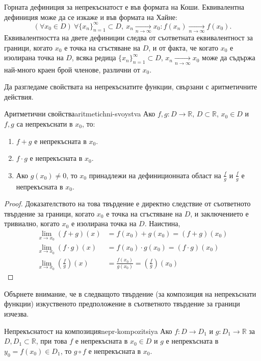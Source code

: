 Горната дефиниция за непрекъснатост е във формата на Коши. Еквивалентна дефиниция може да се изкаже и във формата на Хайне:
\[
(\forall x_0 \in D)\ \forall \{x_n\}_{n=1}^\infty \subset D,\ x_n \xrightarrow[n \to \infty]{} x_0 : f(x_n) \xrightarrow[n \to \infty]{} f(x_0).
\]
Еквивалентността на двете дефиниции следва от съответната еквивалентност за граници, когато $x_0$ е точка на сгъстяване на $D$, и от факта, че когато $x_0$ е изолирана точка на $D$, всяка редица $\{x_n\}_{n=1}^\infty \subset D$, $x_n \xrightarrow[n \to \infty]{} x_0$ може да съдържа най-много краен брой членове, различни от $x_0$.

Да разгледаме свойствата на непрекъснатите функции, свързани с аритметичните действия.

\begin{theorem}{Аритметични свойства}{aritmetichni-svoystva}
Ако $f, g : D \to \mathbb{R}$, $D \subset \mathbb{R}$, $x_0 \in D$ и $f, g$ са непрекъснати в $x_0$, то:
\begin{enumerate}
    \item $f + g$ е непрекъсната в $x_0$.
    \item $f \cdot g$ е непрекъсната в $x_0$.
    \item Ако $g(x_0) \neq 0$, то $x_0$ принадлежи на дефиниционната област на $\frac{f}{g}$ и $\frac{f}{g}$ е непрекъсната в $x_0$.
\end{enumerate}
\end{theorem}

\begin{proof}
Доказателството на това твърдение е директно следствие от съответното твърдение за граници, когато $x_0$ е точка на сгъстяване на $D$, и заключението е тривиално, когато $x_0$ е изолирана точка на $D$. Наистина,
\begin{align*}
\lim_{x \to x_0} (f + g)(x) &= f(x_0) + g(x_0) = (f + g)(x_0) \\
\lim_{x \to x_0} (f \cdot g)(x) &= f(x_0) \cdot g(x_0) = (f \cdot g)(x_0) \\
\lim_{x \to x_0} \left(\frac{f}{g}\right)(x) &= \frac{f(x_0)}{g(x_0)} = \left(\frac{f}{g}\right)(x_0)
\end{align*}
\end{proof}

Обърнете внимание, че в следващото твърдение (за композиция на непрекъснати функции) изкуственото предположение в съответното твърдение за граници изчезва.

\begin{theorem}{Непрекъснатост на композиция}{nepr-kompozitsiya}
Ако $f : D \to D_1$ и $g : D_1 \to \mathbb{R}$ за $D, D_1 \subset \mathbb{R}$, при това $f$ е непрекъсната в $x_0 \in D$ и $g$ е непрекъсната в $y_0 = f(x_0) \in D_1$, то $g \circ f$ е непрекъсната в $x_0$.
\end{theorem}

